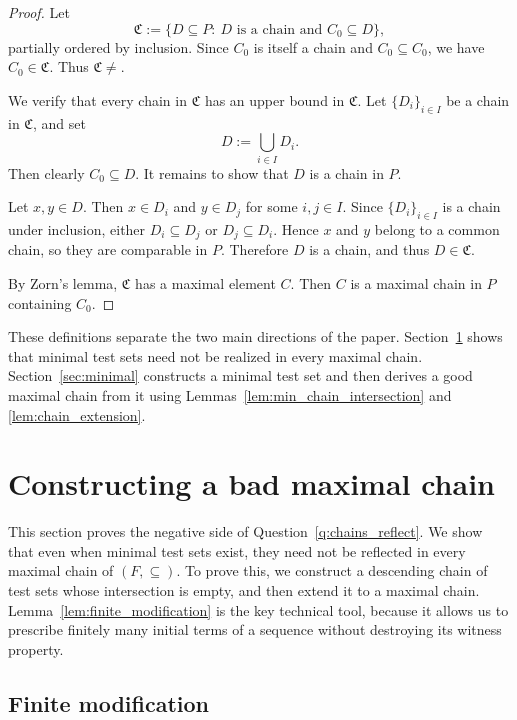 \documentclass[11pt]{amsart}
\theoremstyle{plain}
\theoremstyle{definition}
\theoremstyle{remark}
\newcommand{\F}{\mathcal{F}}
\def\F{F}%
\def\emptyset{}%
\begin{document}
\begin{proof}
Let
\[
\mathfrak C:=\{D\subseteq P:\ D \text{ is a chain and } C_0\subseteq D\},
\]
partially ordered by inclusion.
Since \(C_0\) is itself a chain and \(C_0\subseteq C_0\), we have \(C_0\in\mathfrak C\).
Thus \(\mathfrak C\neq\emptyset\).

We verify that every chain in $\mathfrak C$ has an upper bound in $\mathfrak C$.
Let $\{D_i\}_{i\in I}$ be a chain in $\mathfrak C$, and set
\[
D:=\bigcup_{i\in I}D_i.
\]
Then clearly $C_0\subseteq D$.
It remains to show that $D$ is a chain in $P$.

Let $x,y\in D$.
Then $x\in D_i$ and $y\in D_j$ for some $i,j\in I$.
Since $\{D_i\}_{i\in I}$ is a chain under inclusion, either $D_i\subseteq D_j$ or $D_j\subseteq D_i$.
Hence $x$ and $y$ belong to a common chain, so they are comparable in $P$.
Therefore $D$ is a chain, and thus $D\in\mathfrak C$.

By Zorn's lemma, $\mathfrak C$ has a maximal element $C$.
Then $C$ is a maximal chain in $P$ containing $C_0$.
\end{proof}

These definitions separate the two main directions of the paper.
Section~\ref{sec:bad} shows that minimal test sets need not be realized in every maximal chain.
Section~\ref{sec:minimal} constructs a minimal test set and then derives a good maximal chain from it using Lemmas~\ref{lem:min_chain_intersection} and \ref{lem:chain_extension}.

\section{Constructing a bad maximal chain}\label{sec:bad}

This section proves the negative side of Question~\ref{q:chains_reflect}.
We show that even when minimal test sets exist, they need not be reflected in every maximal chain of $(\F,\subseteq)$.
To prove this, we construct a descending chain of test sets whose intersection is empty, and then extend it to a maximal chain.
Lemma~\ref{lem:finite_modification} is the key technical tool, because it allows us to prescribe finitely many initial terms of a sequence without destroying its witness property.



\subsection{Finite modification}
\end{document}

